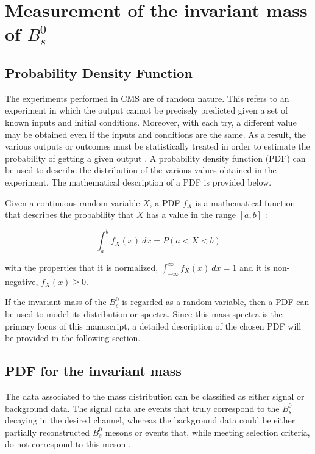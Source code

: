 \chapter[\leavevmode\newline Measurement of the invariant mass of $B^0_s$]{Measurement of the invariant mass of $B^0_s$}
\label{chap:Chapter_4}
\section{Probability Density Function}
The experiments performed in CMS are of random nature. This refers to an experiment in which the output cannot be precisely predicted given a set of known inputs and initial conditions. Moreover, with each try, a different value may be obtained even if the inputs and conditions are the same. As a result, the various outputs or outcomes must be statistically treated in order to estimate the probability of getting a given output \cite{vsirca2016probability}. A probability density function (PDF) can be used to describe the distribution of the various values obtained in the experiment. The mathematical description of a PDF is provided below.

Given a continuous random variable $X$, a PDF $f_X$ is a mathematical function that describes the probability that $X$ has a value in the range $[a, b]$ \cite{bragagnolo2021measurement, vsirca2016probability}:

\begin{equation}
	\int_{a}^{b} f_X(x) \ dx = P(a < X < b)
\end{equation}

with the properties that it is normalized, $\int_{-\infty}^{\infty} f_X(x) \ dx = 1$ and it is non-negative, $f_X(x) \geq 0$.

If the invariant mass of the $B^0_s$ is regarded as a random variable, then a PDF can be used to model its distribution or spectra. Since this mass spectra is the primary focus of this manuscript, a detailed description of the chosen PDF will be provided in the following section.
\section{PDF for the invariant mass}
The data associated to the mass distribution can be classified as either signal or background data. The signal data are events that truly correspond to the $B^0_s$ decaying in the desired channel, whereas the background data could be either partially reconstructed $B^0_s$ mesons or events that, while meeting selection criteria, do not correspond to this meson \cite{mejia2012medida}.

